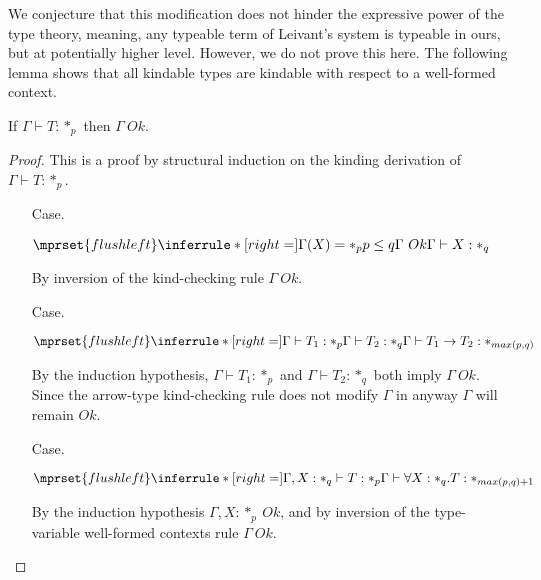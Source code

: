 We conjecture that this modification does not hinder the expressive
power of the type theory, meaning, any typeable term of Leivant's
system is typeable in ours, but at potentially higher level.  However,
we do not prove this here.  The following lemma shows that all
kindable types are kindable with respect to a well-formed context.
\begin{lemma}
  If $\Gamma \vdash T:*_p$ then $\Gamma\ Ok$.
  \label{lemma:kinding_ok_ssf}
\end{lemma}
\begin{proof}
  This is a proof by structural induction on the kinding derivation of $\Gamma \vdash T:*_p$.
  \begin{itemize}
  \item[Case.]\ \\
    \begin{center}
      \begin{math}
        $$\mprset{flushleft}
        \inferrule* [right=] {
          \Gamma(X) = *_p
          \\
          p \leq q
          \\
          \Gamma\ Ok
        }{\Gamma \vdash X : *_q}
      \end{math}
    \end{center}
    By inversion of the kind-checking rule $\Gamma\ Ok$.

  \item[Case.]\ \\
    \begin{center}
      \begin{math}
        $$\mprset{flushleft}
        \inferrule* [right=] {
          \Gamma \vdash T_1 : *_p
          \\
          \Gamma \vdash T_2 : *_q
        }{\Gamma \vdash T_1 \rightarrow T_2 : *_{max(p,q)}}
      \end{math}
    \end{center}
    By the induction hypothesis, $\Gamma \vdash T_1:*_p$ and
    $\Gamma \vdash T_2:*_q$ both imply $\Gamma\ Ok$.  Since the
    arrow-type kind-checking rule does not modify $\Gamma$ in anyway
    $\Gamma$ will remain $Ok$.

  \item[Case.]\ \\
    \begin{center}
      \begin{math}
        $$\mprset{flushleft}
        \inferrule* [right=] {
          \Gamma,X : *_q \vdash T : *_p
        }{\Gamma \vdash \forall X:*_q.T : *_{max(p,q)+1}}
      \end{math}
    \end{center}
    By the induction hypothesis $\Gamma,X:*_p\ Ok$, and by inversion of the type-variable
    well-formed contexts rule $\Gamma\ Ok$.
  \end{itemize}
\end{proof}

